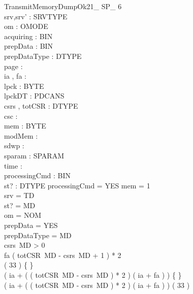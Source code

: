 \begin{schema}{TransmitMemoryDumpOk21\_ SP\_ 6}\\
 srv,srv' : SRVTYPE \\
 om : OMODE \\
 acquiring : BIN \\
 prepData : BIN \\
 prepDataType : DTYPE \\
 page : \nat \\
 ia , fa : \nat \\
 lpck : \seq BYTE \\
 lpckDT : PDCANS \\
 csrs , totCSR : DTYPE \fun \nat \\
 csc : \nat \\
 mem : \nat \pfun BYTE \\
 modMem : \power \nat \\
 sdwp : \nat \\
 sparam : SPARAM \fun \nat \\
 time : \nat \\
 processingCmd : BIN \\
 st? : DTYPE 
\where
 processingCmd = YES \land \dom mem = 1  \\
 srv = TD \\
 st? = MD \\
 om = NOM \\
 prepData = YES \\
 prepDataType = MD \\
 csrs~MD > 0 \\
 fa \leq ( totCSR~MD - csrs~MD + 1 ) * 2 \\
 ( 33  ) \neq \{ \} \\
 ( ia + ( ( totCSR~MD - csrs~MD ) * 2 ) \upto ( ia + fa ) ) \neq \{ \} \\
 ( ia + ( ( totCSR~MD - csrs~MD ) * 2 ) \upto ( ia + fa ) ) \subset ( 33  )
\end{schema}

